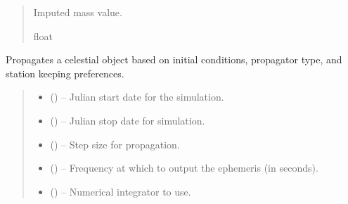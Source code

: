 \documentclass[letterpaper,10pt,english]{sphinxmanual}
\begin{document}
\begin{fulllineitems}
\begin{fulllineitems}
\begin{quote}
\begin{description}
\sphinxAtStartPar
Imputed mass value.

\sphinxAtStartPar
float

\end{description}\end{quote}

\end{fulllineitems}


\begin{fulllineitems}
\label{\detokenize{fspsim.utils:fspsim.utils.SpaceObject.SpaceObject.prop_catobject}}
\pysigstartsignatures
{}
\pysigstopsignatures
\sphinxAtStartPar
Propagates a celestial object based on initial conditions, propagator type, and station keeping preferences.
\begin{quote}\begin{description}
\begin{itemize}
\item {} 
\sphinxAtStartPar
{} () – Julian start date for the simulation.

\item {} 
\sphinxAtStartPar
{} () – Julian stop date for simulation.

\item {} 
\sphinxAtStartPar
{} () – Step size for propagation.

\item {} 
\sphinxAtStartPar
{} () – Frequency at which to output the ephemeris (in seconds).

\item {} 
\sphinxAtStartPar
{} () – Numerical integrator to use.


\end{itemize}
\end{description}
\end{quote}
\end{fulllineitems}
\end{fulllineitems}
\end{document}
